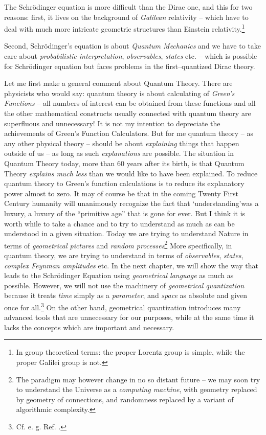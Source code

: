 \documentclass[12pt]{article}
\begin{document}
The Schr\"odinger equation is more
difficult than the Dirac one,  and this for two reasons: 
first,  it lives on the
background of {\sl Galilean} relativity -- which have to deal with much more
intricate geometric structures than Einstein relativity.\footnote{
In group theoretical terms:  the proper Lorentz group is simple, 
while the proper Galilei group is not. } 

Second, 
Schr\"odinger's equation is about {\sl Quantum Mechanics} and we have to take
care about {\sl probabilistic interpretation},  {\sl observables},  {\sl states
} etc.  -- which is possible for Schr\"odinger equation but faces
problems in the first--quantized Dirac theory.

Let me first make a general comment about Quantum Theory.  There are
physicists who would say:  quantum theory is about calculating of {\sl 
Green's Functions} -- all numbers of interest can be obtained from these
functions and all the other mathematical constructs usually connected with 
quantum theory are
superfluous and unnecessary! It is not my intention to depreciate the 
achievements of Green's
Function Calculators.  But for me quantum theory -- 
as any other physical theory -- should be
about  {\sl explaining} things that happen outside of us -- as long as such {\sl 
explanations} are possible.  The situation in Quantum Theory today,  more than
60 years after its birth,  is that Quantum Theory {\sl explains much less}
than we would like to have been explained.
To reduce quantum theory to Green's
function calculations  is to reduce its explanatory power almost
to  zero.  
 It may of course be that in the coming 
  Twenty First  Century humanity will unanimously
recognize the fact that `understanding'\thinspace was a luxury,  a luxury of
the ``primitive age'' that is gone for ever.  But I think it is worth
while to take a chance and to try to  understand as much as can be
understood in a given situation.  Today we are trying to understand Nature
in terms of {\sl geometrical pictures} and
{\sl random processes}\footnote{The paradigm  may however change in no so
distant  future -- we may soon try to understand the Universe as a
{\sl computing machine},  with geometry replaced by geometry of
connections,  and randomness replaced by a variant of algorithmic
complexity. } More specifically,  in quantum theory,  we are trying to
understand in terms of {\sl observables},  {\sl states}, 
{\sl complex Feynman amplitudes}
etc.  In the next chapter,  we will show the way that leads to the
 Schr\"odinger Equation using
{\sl geometrical language} as much as possible.  However,  we will not use the
machinery of {\sl geometrical quantization} because it treats {\sl time}
simply as a {\sl parameter},  and {\sl space} as absolute and
given once for all.\footnote{Cf.  e. g.  Ref.  \cite[Ch. 9]{snia}. }
On the other hand,  geometrical quantization introduces many
advanced tools
that are unnecessary
for our purposes,  while at the same time it lacks the concepts which are
important and necessary.
\end{document}
